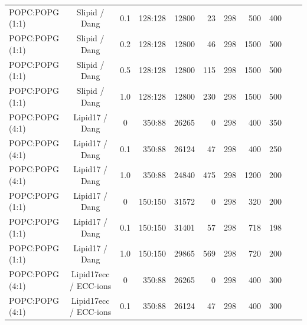 \documentclass[journal=jpcbfk]{achemso}
\begin{document}
\begin{table}[htb]
\begin{minipage}[t]{\textwidth}
{\begin{tabular}{l c c r r r r r r c c}
      POPC:POPG (1:1)        & Slipid / Dang \cite{jambeck12b,jambeck2012another,smith94,dang06} & 0.1  & 128:128 & 12800 & 23  &  298  & 500 & 400 & \cite{slipidPOPC50POPG50T298K} \\
      POPC:POPG (1:1)        & Slipid / Dang \cite{jambeck12b,jambeck2012another,smith94,dang06} & 0.2  & 128:128 & 12800 & 46  &  298  & 1500 & 500 & \cite{slipidPOPC50POPG50T298K} \\
      POPC:POPG (1:1)        & Slipid / Dang \cite{jambeck12b,jambeck2012another,smith94,dang06} & 0.5  & 128:128 & 12800 & 115 &  298  & 1500 & 500 & \cite{slipidPOPC50POPG50T298K} \\
      POPC:POPG (1:1)        & Slipid / Dang \cite{jambeck12b,jambeck2012another,smith94,dang06} & 1.0  & 128:128 & 12800 & 230 &  298  & 1500 & 500 & \cite{slipidPOPC50POPG50T298K} \\
      \hline
      POPC:POPG (4:1)        & Lipid17 / Dang \cite{gould18,smith94,dang06}       & 0  & 350:88 & 26265 & 0  &  298  & 400 & 350 & \cite{Lipid17POPCPOPG8020} \\
      POPC:POPG (4:1)        & Lipid17 / Dang \cite{gould18,smith94,dang06}    & 0.1& 350:88 & 26124 & 47 &  298  & 400 & 250 & \cite{Lipid17POPCPOPG8020100mMCaCl} \\
      POPC:POPG (4:1)        & Lipid17 / Dang \cite{gould18,smith94,dang06}    & 1.0& 350:88 & 24840 & 475 &  298  & 1200 & 200 & \cite{Lipid17POPCPOPG80201000mMCaCl} \\
      POPC:POPG (1:1)        & Lipid17 / Dang \cite{gould18,smith94,dang06}   & 0  & 150:150 & 31572 & 0  &  298  & 320 & 200 & \cite{Lipid17POPCPOPG5050} \\
      POPC:POPG (1:1)        & Lipid17 / Dang \cite{gould18,smith94,dang06}   & 0.1& 150:150 & 31401 & 57 &  298  & 718 & 198 & \cite{Lipid17POPCPOPG5050100mMCaCl} \\
      POPC:POPG (1:1)        & Lipid17 / Dang \cite{gould18,smith94,dang06}  & 1.0& 150:150 & 29865 & 569 &  298  & 720 & 200 & \cite{Lipid17POPCPOPG50501000mMCaCl} \\
      \hline
      POPC:POPG (4:1)        & Lipid17ecc / ECC-ions \cite{pluharova14,kohagen16,martinek18}     &0     & 350:88 & 26265 & 0  &  298  & 400 & 300 & \cite{Lipid17eccPOPCPOPG8020} \\
      POPC:POPG (4:1)        & Lipid17ecc / ECC-ions \cite{pluharova14,kohagen16,martinek18}     & 0.1& 350:88 & 26124 & 47 &  298  & 400 & 300 & \cite{Lipid17eccPOPCPOPG8020100mMCaCl} \\

\end{tabular}}
\end{minipage}
\end{table}
\end{document}
